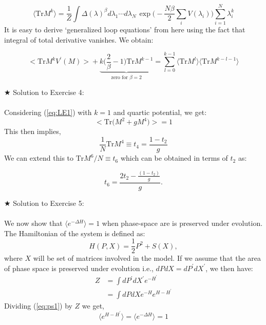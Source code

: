 \documentclass[letter,11pt]{article}
\begin{document}
\begin{equation} 
\langle \mbox{Tr} M^k  \rangle = \frac{1}{Z} \int \Delta(\lambda)^{\beta} 
	d\lambda_1 \cdots d\lambda_{N~} \exp\Bigg(-\frac{N\beta}{2} \sum_{i} V(\lambda_{i})\Bigg)  \sum_{i=1}^{N} \lambda_{i}^k
\end{equation}
It is easy to derive `generalized loop equations' from here using the fact that integral 
of total derivative vanishes. We obtain:

\begin{equation}
		\Big< \mathrm{Tr} M^{k} V^{\prime}(M) \Big> +  \underbrace{k \Bigg(\frac{2}{\beta} - 1 \Bigg) \mathrm{Tr} M^{k-1}}_{\text{zero for $\beta=2$}} = \sum_{l=0}^{k-1} \langle \mathrm{Tr} M^{l} \rangle  \langle \mathrm{Tr} M^{k-l-1} \rangle
\end{equation}
 

\noindent $\bigstar$ Solution to Exercise 4:
\\ \\ Considering (\ref{eq:LE1}) with $k=1$ and quartic potential, we get: 
    \begin{equation}
    \Big< \mathrm{Tr}\Big(M^{2} + g M^{4}\Big) \Big> = 1 
    \end{equation}
    This then implies, 
     \begin{equation}
     \frac{1}{N} \mathrm{Tr} M^{4} \equiv t_{4} =  \frac{1 - t_2}{g} 
     \end{equation}
     We can extend this to $\mathrm{Tr} M^{6}/N \equiv t_{6}$ which can be obtained in terms of 
     $t_2$ as:  
     
     \begin{equation}
     	t_{6} = \frac{2t_{2} - \frac{(1-t_{2})}{g}}{g}. 
     \end{equation} 

\noindent $\bigstar$ Solution to Exercise 5:
\\ \\ We now show that $ \langle e^{-\Delta H} \rangle = 1$ when phase-space are is preserved under evolution. The Hamiltonian of the system is defined as:
\begin{equation}
	H(P,X) = \frac{1}{2}P^2  + S(X), 
\end{equation} 
where $X$ will be set of matrices involved in the model. If we assume that the area of phase space is preserved under evolution i.e., $dP dX = dP^{\prime} dX^{\prime}$, we then have:
\begin{align}
	\label{eq:ps1} 
	Z &= \int dP^{\prime} dX^{\prime} e^{-H^{\prime} \nonumber }  \\
	&=  \int dP dX e^{-H} e^{H-H^{\prime}}
\end{align}
Dividing (\ref{eq:ps1}) by $Z$ we get, 
\begin{equation}
	\langle e^{H-H^{\prime}} \rangle = 	\langle e^{-\Delta H} \rangle = 1
\end{equation}
\end{document}
